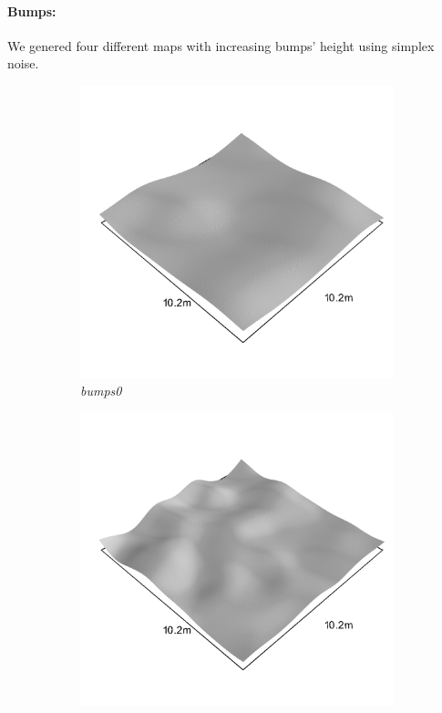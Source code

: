 \documentclass[../document.tex]{subfiles}
\begin{document}
\paragraph{Bumps:} 
We genered four different maps with increasing bumps' height using simplex noise. 
\begin{figure}[H]
    \centering
        \begin{subfigure}[b]{0.23\textwidth}
            \includegraphics[width=\textwidth]{../img/hm3d_borders/bumps0.png}
            \caption{\emph{bumps0}}
        \end{subfigure}
        \begin{subfigure}[b]{0.23\linewidth}
            \includegraphics[width=\textwidth]{../img/hm3d_borders/bumps1.png}

\end{subfigure}
\end{figure}
\end{document}
